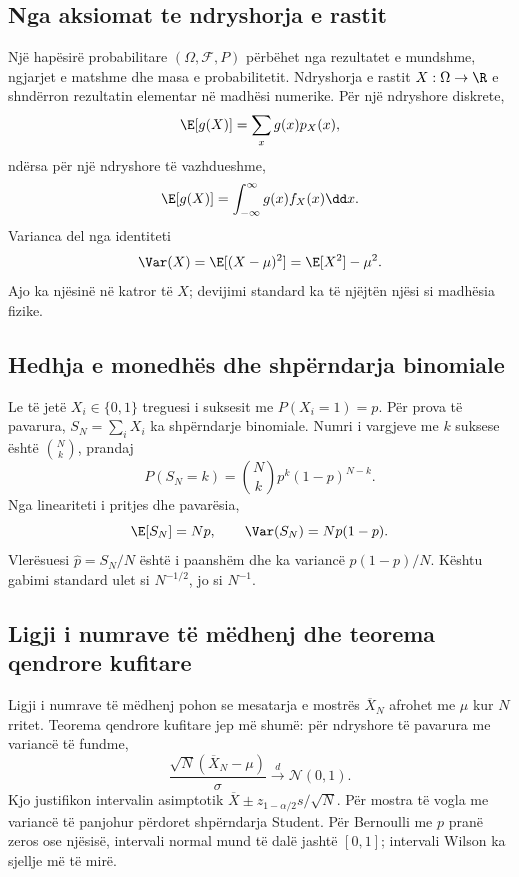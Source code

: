\subsection{Nga aksiomat te ndryshorja e rastit}
Një hapësirë probabilitare $(\Omega,\mathcal F,P)$ përbëhet nga rezultatet e mundshme, ngjarjet e matshme dhe masa e probabilitetit. Ndryshorja e rastit $X:\Omega\to\R$ e shndërron rezultatin elementar në madhësi numerike. Për një ndryshore diskrete,
\begin{equation}
 \E[g(X)]=\sum_x g(x)p_X(x),
\end{equation}
ndërsa për një ndryshore të vazhdueshme,
\begin{equation}
 \E[g(X)]=\int_{-\infty}^{\infty}g(x)f_X(x)\dd x.
\end{equation}
Varianca del nga identiteti
\begin{equation}
 \Var(X)=\E[(X-\mu)^2]=\E[X^2]-\mu^2.
\end{equation}
Ajo ka njësinë në katror të $X$; devijimi standard ka të njëjtën njësi si madhësia fizike.

\subsection{Hedhja e monedhës dhe shpërndarja binomiale}
Le të jetë $X_i\in\{0,1\}$ treguesi i suksesit me $P(X_i=1)=p$. Për prova të pavarura, $S_N=\sum_iX_i$ ka shpërndarje binomiale. Numri i vargjeve me $k$ suksese është $\binom Nk$, prandaj
\begin{equation}
 P(S_N=k)=\binom Nk p^k(1-p)^{N-k}.
\end{equation}
Nga lineariteti i pritjes dhe pavarësia,
\begin{equation}
 \E[S_N]=Np,\qquad \Var(S_N)=Np(1-p).
\end{equation}
Vlerësuesi $\widehat p=S_N/N$ është i paanshëm dhe ka variancë $p(1-p)/N$. Kështu gabimi standard ulet si $N^{-1/2}$, jo si $N^{-1}$.

\subsection{Ligji i numrave të mëdhenj dhe teorema qendrore kufitare}
Ligji i numrave të mëdhenj pohon se mesatarja e mostrës $\overline X_N$ afrohet me $\mu$ kur $N$ rritet. Teorema qendrore kufitare jep më shumë: për ndryshore të pavarura me variancë të fundme,
\begin{equation}
 \frac{\sqrt N(\overline X_N-\mu)}{\sigma}
 \xrightarrow{d}\mathcal N(0,1).
\end{equation}
Kjo justifikon intervalin asimptotik $\overline X\pm z_{1-\alpha/2}s/\sqrt N$. Për mostra të vogla me variancë të panjohur përdoret shpërndarja Student. Për Bernoulli me $p$ pranë zeros ose njësisë, intervali normal mund të dalë jashtë $[0,1]$; intervali Wilson ka sjellje më të mirë.

